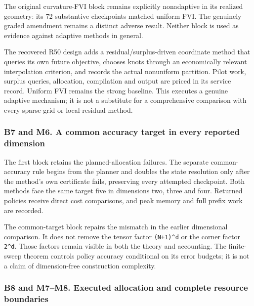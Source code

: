 \documentclass[ecta,nameyear,draft]{econsocart}
\begin{document}
The original curvature-FVI block remains explicitly nonadaptive in its
realized geometry: its 72 substantive checkpoints matched uniform FVI.
The genuinely graded amendment remains a distinct adverse result.
Neither block is used as evidence against adaptive methods in general.

The recovered R50 design adds a residual/surplus-driven coordinate
method that queries its own future objective, chooses knots through an
economically relevant interpolation criterion, and records the actual
nonuniform partition. Pilot work, surplus queries, allocation,
compilation and output are priced in its service record. Uniform FVI
remains the strong baseline. This executes a genuine adaptive mechanism;
it is not a substitute for a comprehensive comparison with every
sparse-grid or local-residual method.

\hypertarget{b7-and-m6.-a-common-accuracy-target-in-every-reported-dimension}{%
\subsubsection{B7 and M6. A common accuracy target in every reported
dimension}\label{b7-and-m6.-a-common-accuracy-target-in-every-reported-dimension}}

The first block retains the planned-allocation failures. The separate
common-accuracy rule begins from the planner and doubles the state
resolution only after the method's own certificate fails, preserving
every attempted checkpoint. Both methods face the same target five in
dimensions two, three and four. Returned policies receive direct cost
comparisons, and peak memory and full prefix work are recorded.

The common-target block repairs the mismatch in the earlier dimensional
comparison. It does not remove the tensor factor \texttt{(N+1)\^{}d} or
the corner factor \texttt{2\^{}d}. Those factors remain visible in both
the theory and accounting. The finite-sweep theorem controls policy
accuracy conditional on its error budgets; it is not a claim of
dimension-free construction complexity.

\hypertarget{b8-and-m7m8.-executed-allocation-and-complete-resource-boundaries}{%
\subsubsection{B8 and M7--M8. Executed allocation and complete resource
boundaries}\label{b8-and-m7m8.-executed-allocation-and-complete-resource-boundaries}}
\end{document}
